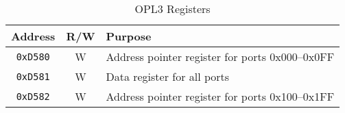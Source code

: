 \begin{table}[ht]
	\begin{center}
		\begin{tabular}{|c|c|l|} \hline
			Address & R/W & Purpose \\ \hline \hline
			\verb+0xD580+ & W & Address pointer register for ports 0x000--0x0FF \\ \hline
			\verb+0xD581+ & W & Data register for all ports \\ \hline
			\verb+0xD582+ & W & Address pointer register for ports 0x100--0x1FF \\ \hline
		\end{tabular}
	\end{center}
	\caption{OPL3 Registers}
	\label{tab:opl3_registers}
\end{table}